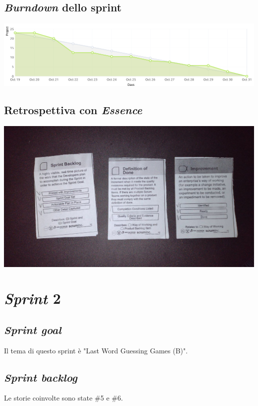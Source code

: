 \documentclass{article}
\begin{document}
\subsection{\emph{Burndown} dello sprint}

\includegraphics[width=\textwidth]{burndown-1}

\subsection{Retrospettiva con \emph{Essence}}

\includegraphics[width=\textwidth]{essence-1}

\section{\emph{Sprint} 2}

\subsection{\emph{Sprint goal}}

Il tema di questo sprint è "Last Word Guessing Games (B)".

\subsection{\emph{Sprint backlog}}

Le storie coinvolte sono state \#5 e \#6.
\end{document}
